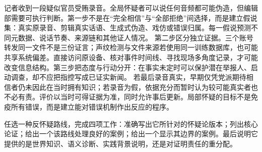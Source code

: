 记者收到一段疑似官员受贿录音。全局怀疑者可以说任何音频都可能伪造，但编辑部需要可执行判断。第一步不是在“完全相信”与“全部拒绝”间选择，而是建立假说集：真实原录音、剪辑真实话语、生成式伪造、戏仿或错误归属。每一假说预测不同元数据、说话节奏、来源链和其他证人情况。 第二步区分独立证据。三个账号转发同一文件不是三份证言；声纹检测与文件来源若使用同一训练数据库，也可能共享系统偏差。直接访问原设备、核对事件时间线、寻找现场多角度记录，才可能改变信息结构。第三步把态度与行动分开：在事实未定时可以保护潜在举报人、启动调查，却不应把指控写成已证实新闻。 若最后录音真实，早期仅凭党派期待相信者仍未因此在当时拥有知识；若录音为假，依据充分而暂时认为较可能真实者也不必有责。评价以当时可得证据为准，同时允许事后更新。局部怀疑的目标不是免疫所有错误，而是建立能对错误机制作出反应的程序。

\begin{tcolorbox}[breakable,colback=white,colframe=blue!30!black,title={本章研读任务},fonttitle=\bfseries]
任选一种反怀疑路线，完成四项工作：准确写出它所针对的怀疑论版本；列出核心论证；给出一个该路线处理良好的案例；给出一个显示其边界的案例。最后说明它提供的是世界知识、语义诊断、实践背景说明，还是对证明责任的重分配。
\end{tcolorbox}
